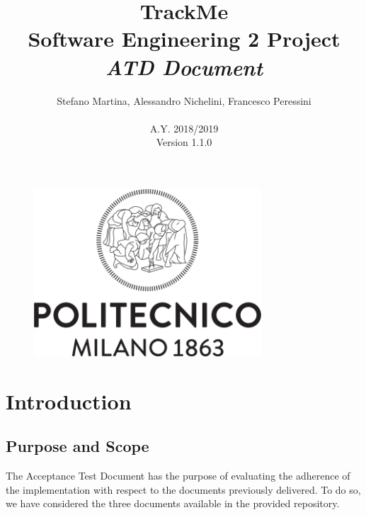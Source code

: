 \documentclass{article}
\begin{document}
\begin{figure}[t]
\centering
	\includegraphics[height=6.25cm,keepaspectratio]{Figures/logo}
\end{figure}

\title{TrackMe \\ Software Engineering 2 Project\\ \textit{ATD Document} }
\author{Stefano Martina, Alessandro Nichelini, Francesco Peressini
		\\ \\ A.Y. 2018/2019 \\ Version 1.1.0}
		
\maketitle
\newpage

\tableofcontents
\newpage

\section{Introduction}

\subsection{Purpose and Scope} 
The Acceptance Test Document has the purpose of evaluating the adherence of the implementation with respect to the  documents previously delivered.\newline
To do so, we have considered the three documents available in the provided repository.
\end{document}
